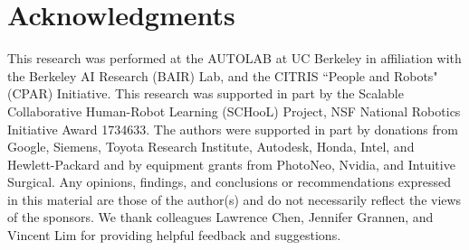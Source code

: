 \section{Acknowledgments}
\footnotesize
This research was performed at the AUTOLAB at UC Berkeley in affiliation with the Berkeley AI Research (BAIR) Lab, and the CITRIS ``People and Robots" (CPAR) Initiative. This research was supported in part by the Scalable Collaborative Human-Robot Learning (SCHooL) Project, NSF National Robotics Initiative Award 1734633. The authors were supported in part by donations from Google, Siemens, 
Toyota Research Institute, Autodesk, Honda, Intel, and Hewlett-Packard and by 
equipment grants from PhotoNeo, Nvidia, and Intuitive Surgical. Any opinions, findings, and conclusions or recommendations expressed in this material are those of the author(s) and do not necessarily reflect the views of the sponsors. %
We thank colleagues Lawrence Chen, Jennifer Grannen, and Vincent Lim for providing helpful feedback and suggestions.